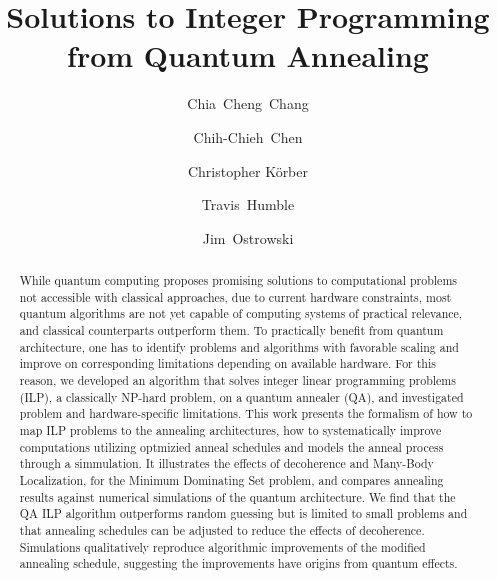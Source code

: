 \documentclass[prd,twocolumn,tightenlines,preprintnumbers,showpacs,superscriptaddress,notitlepage,nofootinbib,eqsecnum,floatfix,longbibliography,aps,10pt]{revtex4-2}
\begin{document}
\title{Solutions to Integer Programming from Quantum Annealing}

\author{Chia~Cheng~Chang}
	\author{Chih-Chieh~Chen }
\author{Christopher K\"orber}
\author{Travis~Humble}
\author{Jim~Ostrowski}

\newcommand{\alert}[1]{\textbf{\color{red}{#1}}}
\renewcommand{\vec}[1]{\boldsymbol{#1}}

\newcommand{\ghissue}[2]{
 \noindent\fbox{\parbox{0.49\textwidth}{
   \alert{[#1]}%
   \\%
   \href{https://github.com/cchang5/quantum\_linear\_programming/pull/#2}{See GitHub issue #2}}%
 }
}


\begin{abstract}
 While quantum computing proposes promising solutions to computational problems not accessible with classical approaches, due to current hardware constraints, most quantum algorithms are not yet capable of computing systems of practical relevance, and classical counterparts outperform them.
 To practically benefit from quantum architecture, one has to identify problems and algorithms with favorable scaling and improve on corresponding limitations depending on available hardware.
 For this reason, we developed an algorithm that solves integer linear programming problems (ILP), a classically NP-hard problem, on a quantum annealer (QA), and investigated problem and hardware-specific limitations.
 This work presents the formalism of how to map ILP problems to the annealing architectures, how to systematically improve computations utilizing optmizied anneal schedules and models the anneal process through a simmulation.
 It illustrates the effects of decoherence and Many-Body Localization, for the Minimum Dominating Set problem, and compares annealing results against numerical simulations of the quantum architecture.
 We find that the QA ILP algorithm outperforms random guessing but is limited to small problems and that annealing schedules can be adjusted to reduce the effects of decoherence.
 Simulations qualitatively reproduce algorithmic improvements of the modified annealing schedule, suggesting the improvements have origins from quantum effects.
\end{abstract}
\end{document}
